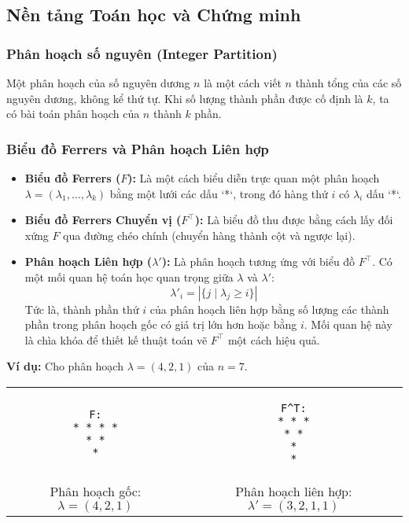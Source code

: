 \documentclass[a4paper,12pt]{article}
\begin{document}
\subsection{Nền tảng Toán học và Chứng minh}

\subsubsection{Phân hoạch số nguyên (Integer Partition)}
Một phân hoạch của số nguyên dương $n$ là một cách viết $n$ thành tổng của các số nguyên dương, không kể thứ tự. Khi số lượng thành phần được cố định là $k$, ta có bài toán phân hoạch của $n$ thành $k$ phần.

\subsubsection{Biểu đồ Ferrers và Phân hoạch Liên hợp}
\begin{itemize}
    \item \textbf{Biểu đồ Ferrers ($F$):} Là một cách biểu diễn trực quan một phân hoạch $\lambda = (\lambda_1, \dots, \lambda_k)$ bằng một lưới các dấu `*`, trong đó hàng thứ $i$ có $\lambda_i$ dấu `*`.
    
    \item \textbf{Biểu đồ Ferrers Chuyển vị ($F^\top$):} Là biểu đồ thu được bằng cách lấy đối xứng $F$ qua đường chéo chính (chuyển hàng thành cột và ngược lại).
    
    \item \textbf{Phân hoạch Liên hợp ($\lambda'$):} Là phân hoạch tương ứng với biểu đồ $F^\top$. Có một mối quan hệ toán học quan trọng giữa $\lambda$ và $\lambda'$:
    \[ \lambda'_i = |\{j \mid \lambda_j \ge i\}| \]
    Tức là, thành phần thứ $i$ của phân hoạch liên hợp bằng số lượng các thành phần trong phân hoạch gốc có giá trị lớn hơn hoặc bằng $i$. Mối quan hệ này là chìa khóa để thiết kế thuật toán vẽ $F^\top$ một cách hiệu quả.
\end{itemize}
\textbf{Ví dụ:} Cho phân hoạch $\lambda=(4,2,1)$ của $n=7$.
\begin{center}
\begin{tabular}{cc}
\begin{lstlisting}[basicstyle=\ttfamily]
F:
* * * *
* *
*
\end{lstlisting}
&
\begin{lstlisting}[basicstyle=\ttfamily]
F^T:
* * *
* *
*
*
\end{lstlisting}
\\
Phân hoạch gốc: $\lambda = (4,2,1)$ & Phân hoạch liên hợp: $\lambda' = (3,2,1,1)$
\end{tabular}
\end{center}
\end{document}
